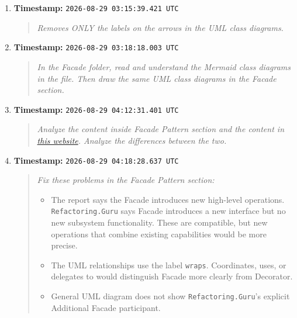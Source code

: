 \documentclass[11pt,a4paper]{report}
\begin{document}
\begin{enumerate}
  \item \textbf{Timestamp:} \verb|2026-08-29 03:15:39.421 UTC|
  \begin{quote}\itshape
  Removes ONLY the labels on the arrows in the UML class diagrams.
  \end{quote}

  \item \textbf{Timestamp:} \verb|2026-08-29 03:18:18.003 UTC|
  \begin{quote}\itshape
  In the \textquotedbl{}Facade\textquotedbl{} folder, read and understand the
  Mermaid class diagrams in the  file. Then draw the same UML
  class diagrams in the Facade section.
  \end{quote}

  \item \textbf{Timestamp:} \verb|2026-08-29 04:12:31.401 UTC|
  \begin{quote}\itshape
  Analyze the content inside \textquotedbl{}Facade Pattern\textquotedbl{}
  section and the content in
  \href{https://refactoring.guru/design-patterns/facade}{this website}.
  Analyze the differences between the two.
  \end{quote}

  \item \textbf{Timestamp:} \verb|2026-08-29 04:18:28.637 UTC|
  \begin{quote}\itshape
  Fix these problems in the \textquotedbl{}Facade Pattern\textquotedbl{}
  section:
  \begin{itemize}
    \item The report says the Facade \textquotedbl{}introduces new high-level
    operations.\textquotedbl{}\\
    \texttt{Refactoring.Guru} says Facade introduces
    a new interface but no new subsystem functionality. These are compatible,
    but \textquotedbl{}new operations that combine existing
    capabilities\textquotedbl{} would be more precise.
    \item The UML relationships use the label \texttt{wraps}. Coordinates,
    uses, or delegates to would distinguish Facade more clearly from Decorator.
    \item General UML diagram does not show \texttt{Refactoring.Guru}'s
    explicit \textquotedbl{}Additional Facade\textquotedbl{} participant.
  \end{itemize}
  \end{quote}
\end{enumerate}
\end{document}
